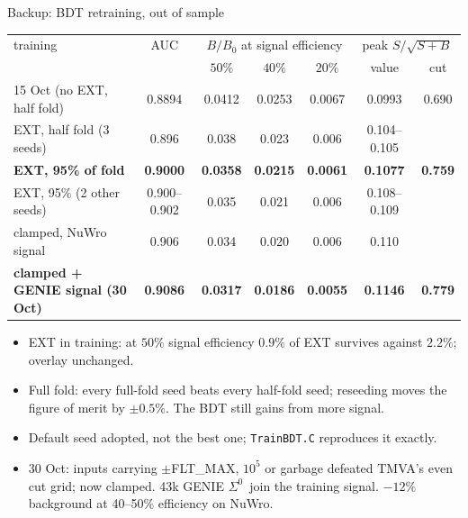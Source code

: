 \documentclass[aspectratio=169,10pt]{beamer}
\newcommand{\Szero}{\ensuremath{\Sigma^{0}}}
\begin{document}
\begin{frame}{Backup: BDT retraining, out of sample}
  \footnotesize
  \begin{center}
  \begin{tabular}{lcccccc}
    \toprule
    training & AUC & \multicolumn{3}{c}{$B/B_0$ at signal efficiency} & \multicolumn{2}{c}{peak $S/\sqrt{S+B}$} \\
             &     & $50\%$ & $40\%$ & $20\%$ & value & cut \\
    \midrule
    15 Oct (no EXT, half fold)  & 0.8894 & 0.0412 & 0.0253 & 0.0067 & 0.0993 & 0.690 \\
    EXT, half fold (3 seeds)    & 0.896 & 0.038 & 0.023 & 0.006 & 0.104--0.105 & \\
    \textbf{EXT, 95\% of fold}  & \textbf{0.9000} & \textbf{0.0358} & \textbf{0.0215} & \textbf{0.0061} & \textbf{0.1077} & \textbf{0.759} \\
    EXT, 95\% (2 other seeds)   & 0.900--0.902 & 0.035 & 0.021 & 0.006 & 0.108--0.109 & \\
    \midrule
    clamped, NuWro signal       & 0.906 & 0.034 & 0.020 & 0.006 & 0.110 & \\
    \textbf{clamped + GENIE signal (30 Oct)} & \textbf{0.9086} & \textbf{0.0317} & \textbf{0.0186} & \textbf{0.0055} & \textbf{0.1146} & \textbf{0.779} \\
    \bottomrule
  \end{tabular}
  \end{center}
  \small
  \begin{itemize}
    \item EXT in training: at $50\%$ signal efficiency $0.9\%$ of EXT survives against $2.2\%$;
          overlay unchanged.
    \item Full fold: every full-fold seed beats every half-fold seed; reseeding moves the
          figure of merit by $\pm0.5\%$. The BDT still gains from more signal.
    \item Default seed adopted, not the best one; \texttt{TrainBDT.C} reproduces it exactly.
    \item 30 Oct: inputs carrying $\pm$FLT\_MAX, $10^5$ or garbage defeated TMVA's even
          cut grid; now clamped. 43k GENIE \Szero\ join the training signal. $-12\%$
          background at 40--50\% efficiency on NuWro.
  \end{itemize}
\end{frame}
\end{document}
